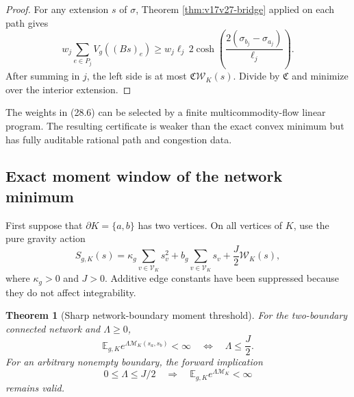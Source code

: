\documentclass[11pt]{article}
\newtheorem{theorem}{Theorem}[section]
\theoremstyle{remark}
\begin{document}
\begin{proof}
For any extension \(s\) of \(\sigma\), Theorem
\ref{thm:v17v27-bridge} applied on each path gives
\[
 w_j\sum_{e\in P_j}V_g((Bs)_e)
 \geq w_j\ell_j
 \,2\cosh\left(
 \frac{2(\sigma_{b_j}-\sigma_{a_j})}{\ell_j}
 \right).                                         \tag{28.9}
\]
After summing in \(j\), the left side is at most
\(\mathfrak C\mathcal W_K(s)\).  Divide by
\(\mathfrak C\) and minimize over the interior extension.
\end{proof}

The weights in (28.6) can be selected by a finite multicommodity-flow
linear program.  The resulting certificate is weaker than the exact
convex minimum but has fully auditable rational path and congestion
data.

\subsection{Exact moment window of the network minimum}

First suppose that \(\partial K=\{a,b\}\) has two vertices.  On all
vertices of \(K\), use the pure gravity action
\[
 S_{g,K}(s)
 =\kappa_g\sum_{v\in\mathcal V_K}s_v^2
 +b_g\sum_{v\in\mathcal V_K}s_v
 +\frac J2\mathcal W_K(s),                         \tag{28.10}
\]
where \(\kappa_g>0\) and \(J>0\).  Additive edge constants have been
suppressed because they do not affect integrability.

\begin{theorem}[Sharp network-boundary moment threshold]
\label{thm:v17v28-network-window}
For the two-boundary connected network and \(\Lambda\geq0\),
\[
 \mathbb E_{g,K}
 e^{\Lambda\mathcal M_K(s_a,s_b)}<\infty
 \quad\Longleftrightarrow\quad
 \Lambda\leq\frac J2.                             \tag{28.11}
\]
For an arbitrary nonempty boundary, the forward implication
\[
 0\leq\Lambda\leq J/2
 \quad\Longrightarrow\quad
 \mathbb E_{g,K}e^{\Lambda\mathcal M_K}<\infty     \tag{28.12}
\]
remains valid.
\end{theorem}
\end{document}
